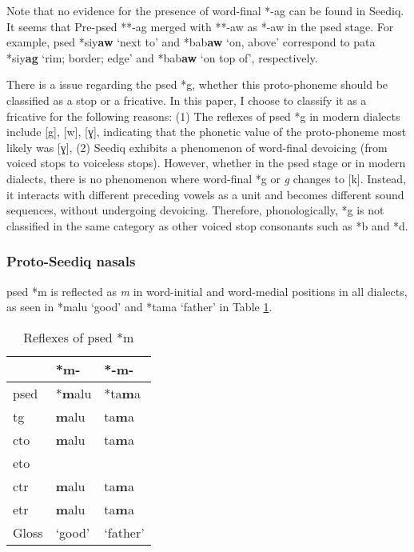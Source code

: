 Note that no evidence for the presence of word-final *-ag can be found in Seediq. It seems that Pre-\acl{psed} **-ag merged with **-aw as *-aw in the \acl{psed} stage. For example, \acl{psed} *siy\textbf{aw} `next to' and *bab\textbf{aw} `on, above' correspond to \acl{pata} *siy\textbf{ag} `rim; border; edge' and *bab\textbf{aw} `on top of', respectively.

There is a issue regarding the \acl{psed} *g, whether this proto-phoneme should be classified as a stop or a fricative. In this paper, I choose to classify it as a fricative for the following reasons: (1) The reflexes of \acl{psed} *g in modern dialects include [g], [w], [ɣ], indicating that the phonetic value of the proto-phoneme most likely was [ɣ], (2) Seediq exhibits a phenomenon of word-final devoicing (from voiced stops to voiceless stops). However, whether in the \acl{psed} stage or in modern dialects, there is no phenomenon where word-final *g or \textit{g} changes to [k]. Instead, it interacts with different preceding vowels as a unit and becomes different sound sequences, without undergoing devoicing. Therefore, phonologically, *g is not classified in the same category as other voiced stop consonants such as *b and *d.

\subsubsection{Proto-Seediq nasals}

\acl{psed} *m is reflected as \textit{m} in word-initial and word-medial positions in all dialects, as seen in *malu `good' and *tama `father' in Table \ref{tab:psed_m}.

\begin{table}[!htbp]
\centering
\caption{Reflexes of \acl{psed} *m}
\label{tab:psed_m}
\begin{tabular}{lll}
\hline
           & *m-    & *-m-     \\ \hline
\acs{psed} & *\textbf{m}alu  & *ta\textbf{m}a    \\ \hdashline
\acs{tg}   & \textbf{m}alu   & ta\textbf{m}a     \\
\acs{cto}  & \textbf{m}alu   & ta\textbf{m}a     \\
\acs{eto}  &        &          \\
\acs{ctr}  & \textbf{m}alu   & ta\textbf{m}a     \\
\acs{etr}  & \textbf{m}alu   & ta\textbf{m}a     \\ \hline
Gloss      & `good' & `father' \\ \hline
\end{tabular}
\end{table}


